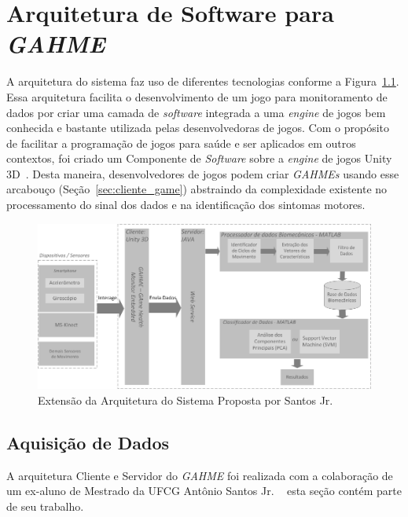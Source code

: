 \chapter{Arquitetura de Software para \textit{GAHME}}\label{chapter:arquitetura_captura}

A arquitetura do sistema faz uso de diferentes tecnologias conforme a Figura~\ref{fig:arquitetura}. Essa arquitetura facilita o desenvolvimento de um jogo para monitoramento de dados por criar uma camada de \textit{software} integrada a uma \textit{engine} de jogos bem conhecida e bastante utilizada pelas desenvolvedoras de jogos. Com o propósito de facilitar a programação de jogos para saúde e ser aplicados em outros contextos, foi criado um Componente de \textit{Software} sobre a \textit{engine} de jogos Unity 3D~\cite{unity3d}. Desta maneira, desenvolvedores de jogos podem criar \textit{GAHMEs} usando esse arcabouço (Seção~\ref{sec:cliente_game}) abstraindo da complexidade existente no processamento do sinal dos dados e na identificação dos sintomas motores. 

\begin{figure}[!htbp]
 \centering
 \includegraphics[scale=0.4]{./img/arquitetura}
\caption[Extensão da Arquitetura do Sistema Proposta por Santos Jr.]{Extensão da Arquitetura do Sistema Proposta por Santos Jr. ~\cite{antonio2013}}
 \label{fig:arquitetura}
\end{figure}

\section{Aquisição de Dados}
A arquitetura Cliente e Servidor do \textit{GAHME} foi realizada com a colaboração de um ex-aluno de Mestrado da UFCG  Antônio Santos Jr. ~\cite{antonio2013} esta seção contém parte de seu trabalho.


